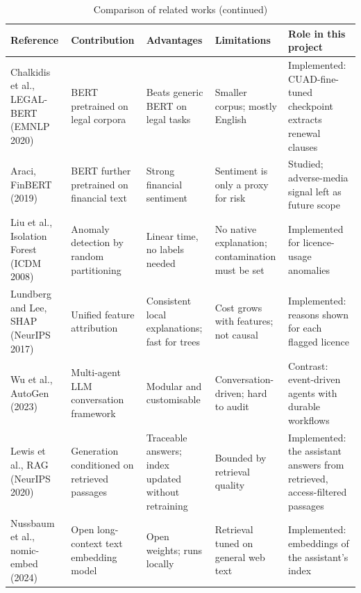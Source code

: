 \begin{table}[H]
\centering\tablestyle
\caption{Comparison of related works (continued)}\label{tab:related2}
\begin{tabularx}{\textwidth}{|L{0.16\textwidth}|L{0.18\textwidth}|L{0.16\textwidth}|L{0.17\textwidth}|Y|}
\hline
\textbf{Reference} & \textbf{Contribution} & \textbf{Advantages} & \textbf{Limitations} & \textbf{Role in this project} \\ \hline
Chalkidis et al., LEGAL-BERT (EMNLP 2020)~\cite{chalkidis2020legalbert} & BERT pretrained on legal corpora & Beats generic BERT on legal tasks & Smaller corpus; mostly English & Implemented: CUAD-fine-tuned checkpoint extracts renewal clauses \\ \hline
Araci, FinBERT (2019)~\cite{araci2019finbert} & BERT further pretrained on financial text & Strong financial sentiment & Sentiment is only a proxy for risk & Studied; adverse-media signal left as future scope \\ \hline
Liu et al., Isolation Forest (ICDM 2008)~\cite{liu2008isolation} & Anomaly detection by random partitioning & Linear time, no labels needed & No native explanation; contamination must be set & Implemented for licence-usage anomalies \\ \hline
Lundberg and Lee, SHAP (NeurIPS 2017)~\cite{lundberg2017shap} & Unified feature attribution & Consistent local explanations; fast for trees & Cost grows with features; not causal & Implemented: reasons shown for each flagged licence \\ \hline
Wu et al., AutoGen (2023)~\cite{wu2023autogen} & Multi-agent LLM conversation framework & Modular and customisable & Conversation-driven; hard to audit & Contrast: event-driven agents with durable workflows \\ \hline
Lewis et al., RAG (NeurIPS 2020)~\cite{lewis2020rag} & Generation conditioned on retrieved passages & Traceable answers; index updated without retraining & Bounded by retrieval quality & Implemented: the assistant answers from retrieved, access-filtered passages \\ \hline
Nussbaum et al., nomic-embed (2024)~\cite{nussbaum2024nomic} & Open long-context text embedding model & Open weights; runs locally & Retrieval tuned on general web text & Implemented: embeddings of the assistant's index \\ \hline
\end{tabularx}
\end{table}

